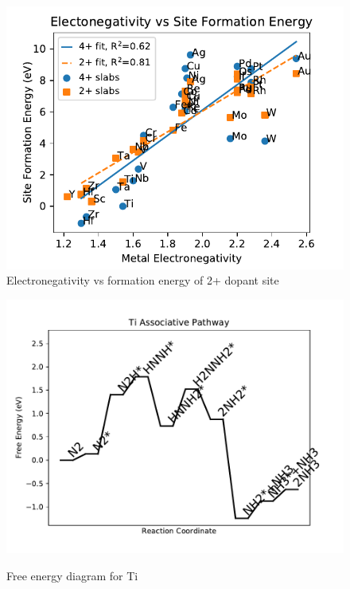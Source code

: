 \documentclass{article}
\begin{document}
\begin{figure}
\centering
\includegraphics[width=0.8\linewidth]{Images/electronegativity_vs_formation.pdf}
\caption{Electronegativity vs formation energy of 2+ dopant site}
\label{fig:electronegativity}
\end{figure}

\twocolumn
\clearpage
\begin{figure}
\includegraphics[width=1\linewidth]{data/plots/Ti_associative.pdf}
\label{fig:Ti_associative}
\caption{Free energy diagram for Ti}
\end{figure}
\end{document}

